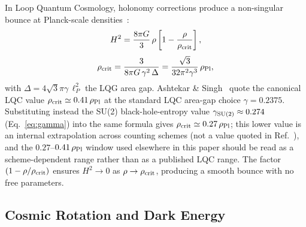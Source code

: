 \documentclass[aps,prd,twocolumn,superscriptaddress,showpacs,preprintnumbers,nofootinbib,longbibliography,floatfix]{revtex4-2}
\newcommand{\rhocrit}{\rho_{\rm crit}}
\newcommand{\rhoPl}{\rho_{\rm Pl}}
\begin{document}
In Loop Quantum Cosmology, holonomy corrections produce a non-singular bounce at
Planck-scale densities~\cite{Ashtekar2011}:
\begin{equation}\label{eq:modfriedmann}
H^2 = \frac{8\pi G}{3}\,\rho\left[1-\frac{\rho}{\rhocrit}\right],
\end{equation}
\begin{equation}\label{eq:rhocrit}
\rhocrit = \frac{3}{8\pi G\,\gamma^2\,\Delta} = \frac{\sqrt{3}}{32\pi^2\gamma^3}\,\rhoPl,
\end{equation}
with $\Delta = 4\sqrt{3}\pi\gamma\,\ell_P^2$ the LQG area gap. Ashtekar
\& Singh~\cite{Ashtekar2011} quote the canonical LQC value
$\rhocrit \simeq 0.41\,\rhoPl$ at the standard LQC area-gap choice
$\gamma = 0.2375$. Substituting instead the SU(2)
black-hole-entropy value $\gamma_{\rm SU(2)} \approx 0.274$
(Eq.~\ref{eq:gamma}) into the same formula gives
$\rhocrit \simeq 0.27\,\rhoPl$; this lower value is an internal
extrapolation across counting schemes (not a value quoted in
Ref.~\cite{Ashtekar2011}), and the $0.27$--$0.41\,\rhoPl$ window
used elsewhere in this paper should be read as a scheme-dependent
range rather than as a published LQC range. The factor
$(1-\rho/\rhocrit)$ ensures $H^2\to 0$ as $\rho\to\rhocrit$, producing a smooth
bounce with no free parameters.


\subsection{Cosmic Rotation and Dark Energy}\label{sec:rotation}
\end{document}
